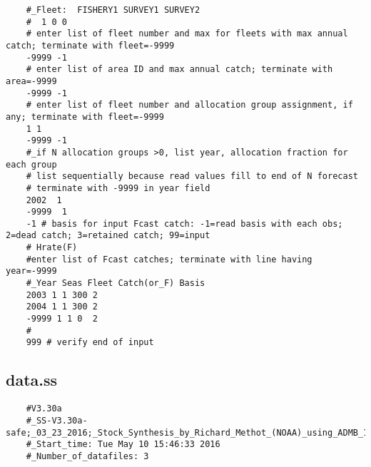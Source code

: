 \begin{landscape}
{\begin{verbatim}
	#_Fleet:  FISHERY1 SURVEY1 SURVEY2
	#  1 0 0
	# enter list of fleet number and max for fleets with max annual catch; terminate with fleet=-9999
	-9999 -1
	# enter list of area ID and max annual catch; terminate with area=-9999
	-9999 -1
	# enter list of fleet number and allocation group assignment, if any; terminate with fleet=-9999
	1 1
	-9999 -1
	#_if N allocation groups >0, list year, allocation fraction for each group 
	# list sequentially because read values fill to end of N forecast
	# terminate with -9999 in year field 
	2002  1
	-9999  1 
	-1 # basis for input Fcast catch: -1=read basis with each obs; 2=dead catch; 3=retained catch; 99=input
	# Hrate(F)
	#enter list of Fcast catches; terminate with line having year=-9999
	#_Year Seas Fleet Catch(or_F) Basis 
	2003 1 1 300 2
	2004 1 1 300 2
	-9999 1 1 0  2 
	#
	999 # verify end of input 
\end{verbatim}
}



\subsection{data.ss}
\scriptsize{
\begin{verbatim}
	#V3.30a
	#_SS-V3.30a-safe;_03_23_2016;_Stock_Synthesis_by_Richard_Methot_(NOAA)_using_ADMB_11.1
	#_Start_time: Tue May 10 15:46:33 2016
	#_Number_of_datafiles: 3
	

\end{verbatim}}
\end{landscape}
